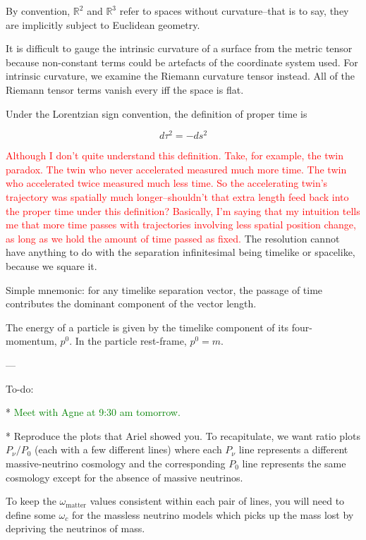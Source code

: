 \documentclass[11pt]{article}
\begin{document}
By convention, $\mathbb{R}^2$ and $\mathbb{R}^3$ refer to spaces without curvature--that is to say, they are implicitly subject to Euclidean geometry.

It is difficult to gauge the intrinsic curvature of a surface from the metric tensor because non-constant terms could be artefacts of the coordinate system used. For intrinsic curvature, we examine the Riemann curvature tensor instead. All of the Riemann tensor terms vanish every iff the space is flat.

Under the Lorentzian sign convention, the definition of proper time is

\begin{equation}
	d\tau^2 = -ds^2
\end{equation}

\textcolor{red}{Although I don't quite understand this definition. Take, for example, the twin paradox. The twin who never accelerated measured much more time. The twin who accelerated twice measured much less time. So the accelerating twin's trajectory was spatially much longer--shouldn't that extra length feed back into the proper time under this definition? Basically, I'm saying that my intuition tells me that more time passes with trajectories involving less spatial position change, as long as we hold the amount of time passed as fixed.} The resolution cannot have anything to do with the separation infinitesimal being timelike or spacelike, because we square it.

Simple mnemonic: for any timelike separation vector, the passage of time contributes the dominant component of the vector length.

The energy of a particle is given by the timelike component of its four-momentum, $p^0$. In the particle rest-frame, $p^0 = m$.

---

To-do:

* \textcolor{green}{Meet with Agne at 9:30 am tomorrow.}

* Reproduce the plots that Ariel showed you. To recapitulate, we want ratio plots $P_\nu / P_0$ (each with a few different lines) where each $P_\nu$ line represents a different massive-neutrino cosmology and the corresponding $P_0$ line represents the same cosmology except for the absence of massive neutrinos.

To keep the $\omega_\text{matter}$ values consistent within each pair of lines, you will need to define some $\omega_c$ for the massless neutrino models which picks up the mass lost by depriving the neutrinos of mass.
\end{document}
